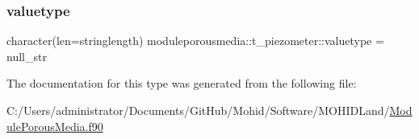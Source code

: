 \subsubsection{\texorpdfstring{valuetype}{valuetype}}
{\footnotesize\ttfamily character(len=stringlength) moduleporousmedia\+::t\+\_\+piezometer\+::valuetype = null\+\_\+str\hspace{0.3cm}{\ttfamily [private]}}



The documentation for this type was generated from the following file\+:\begin{DoxyCompactItemize}
\item 
C\+:/\+Users/administrator/\+Documents/\+Git\+Hub/\+Mohid/\+Software/\+M\+O\+H\+I\+D\+Land/\mbox{\hyperlink{_module_porous_media_8f90}{Module\+Porous\+Media.\+f90}}\end{DoxyCompactItemize}
